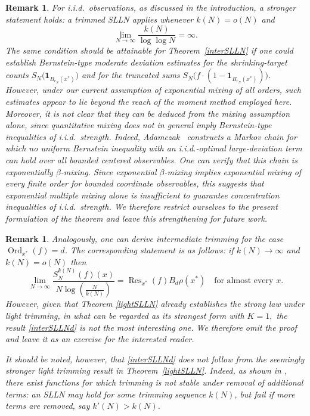 \documentclass[11pt,twoside,a4paper,reqno]{amsart}
\newtheorem{remark}[theorem]{Remark}
\def\one{{\mathbf{1}}}
\begin{document}
\begin{remark}
For i.i.d.\ observations, as discussed in the introduction, a stronger statement holds: a trimmed SLLN applies whenever $k(N)=o(N)$ and
\begin{equation*}
\lim_{N\to\infty} \frac{k(N)}{\log \log N} = \infty.
\end{equation*}
The same condition should be attainable for Theorem~\ref{interSLLN} if one could establish Bernstein-type moderate deviation estimates for the shrinking-target counts $S_N\bigl(\one_{B_{r_N}(x^*)}\bigr)$ and for the truncated sums $S_N\bigl(f \cdot (1-\one_{B_{r_N}(x^*)})\bigr)$.
However, under our current assumption of exponential mixing of all orders, such estimates appear to lie beyond the reach of the moment method employed here. Moreover, it is not clear that they can be deduced from the mixing assumption alone, since quantitative mixing does not in general imply Bernstein-type inequalities of i.i.d.\ strength. Indeed, Adamczak~\cite[Section~3.3]{Ada08} constructs a Markov chain for which no uniform Bernstein inequality with an i.i.d.-optimal large-deviation term can hold over all bounded centered observables. One can verify that this chain is exponentially $\beta$-mixing. Since exponential $\beta$-mixing implies exponential mixing of every finite order for bounded coordinate observables, this suggests that exponential multiple mixing alone is insufficient to guarantee concentration inequalities of i.i.d.\ strength. We therefore restrict ourselves to the present formulation of the theorem and leave this strengthening for future work.
\end{remark}










\begin{remark}
Analogously, one can derive intermediate trimming for the case $\operatorname{Ord}_{x^*}(f) = d$. The corresponding statement is as follows: if $k(N) \rightarrow\infty$ and $k(N)=o(N)$ then
\begin{equation}\label{interSLLNd}
\lim_{N \to \infty} \frac{S_N^{k(N)}(f)(x)}{N \log \left(\frac{N}{k(N)} \right)} =\operatorname{Res}_{x^*}(f)B_d \rho(x^*) \quad \text{for almost every } x.
\end{equation}
However, given that Theorem \ref{lightSLLN} already establishes the strong law under light trimming, in what can be regarded as its strongest form with $K=1,$ the result \eqref{interSLLNd} is not the most interesting one. We therefore omit the proof and leave it as an exercise for the interested reader.

It should be noted, however, that \eqref{interSLLNd} does not follow from the seemingly stronger light trimming result in Theorem~\ref{lightSLLN}. Indeed, as shown in \cite{AS25}, there exist functions for which trimming is not stable under removal of additional terms: an SLLN may hold for some trimming sequence $k(N)$, but fail if more terms are removed, say $k'(N) > k(N)$.
\end{remark}
\end{document}
